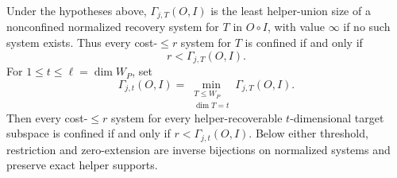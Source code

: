 \begin{theorem}
\label{thm:ungated-ranked-confinement}
%
%
Under the hypotheses above, $\Gamma_{j,T}(O,I)$ is the least helper-union
size of a nonconfined normalized recovery system for $T$ in $O\circ I$, with
value $\infty$ if no such system exists.
Thus every cost-$\leq r$ system for $T$ is confined if and only if
\begin{equation}
 r<\Gamma_{j,T}(O,I).
 \label{eq:weighted-subspace-gate}
\end{equation}
For $1\leq t\leq\ell=\dim W_P$, set
\begin{equation}
 \Gamma_{j,t}(O,I)=
 \min_{\substack{T\leq W_P\\\dim T=t}}\Gamma_{j,T}(O,I).
 \label{eq:ranked-weighted-cost}
\end{equation}
Then every cost-$\leq r$ system for every helper-recoverable
$t$-dimensional target subspace is confined if and only if
$r<\Gamma_{j,t}(O,I)$.  Below either threshold, restriction and zero-extension
are inverse bijections on normalized systems and preserve exact helper
supports.
\end{theorem}

